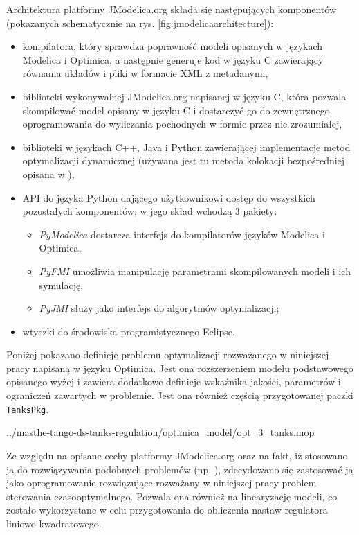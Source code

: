 Architektura platformy JModelica.org składa się następujących komponentów (pokazanych schematycznie na rys. \ref{fig:jmodelicaarchitecture}):
\begin{itemize}
    \item kompilatora, który sprawdza poprawność modeli opisanych w językach Modelica i Optimica, a następnie generuje kod w języku C zawierający równania układów i pliki w formacie XML z metadanymi,
    \item biblioteki wykonywalnej JModelica.org napisanej w języku C, która pozwala skompilować model opisany w języku C i dostarczyć go do zewnętrznego oprogramowania do wyliczania pochodnych w formie przez nie zrozumiałej,
    \item biblioteki w językach C++, Java i Python zawierającej implementacje metod optymalizacji dynamicznej (używana jest tu metoda kolokacji bezpośredniej opisana w \cite{ake+10cace}),
    \item API do języka Python dającego użytkownikowi dostęp do wszystkich pozostałych komponentów; w jego skład wchodzą 3 pakiety:
    \begin{itemize}
        \item \emph{PyModelica} dostarcza interfejs do kompilatorów języków Modelica i Optimica,
        \item \emph{PyFMI} umożliwia manipulację parametrami skompilowanych modeli i ich symulację,
        \item \emph{PyJMI} służy jako interfejs do algorytmów optymalizacji;
    \end{itemize}
    \item wtyczki do środowiska programistycznego Eclipse.
\end{itemize}

Poniżej pokazano definicję problemu optymalizacji rozważanego w niniejszej pracy napisaną w języku Optimica.
Jest ona rozszerzeniem modelu podstawowego opisanego wyżej i zawiera dodatkowe definicje wskaźnika jakości, parametrów i ograniczeń zawartych w problemie. Jest ona również częścią przygotowanej paczki \texttt{TanksPkg}.


{../masthe-tango-ds-tanks-regulation/optimica_model/opt_3_tanks.mop}

Ze względu na opisane cechy platformy JModelica.org oraz na fakt, iż stosowano ją do rozwiązywania podobnych problemów (np. \cite{Hast09}), zdecydowano się zastosować ją jako oprogramowanie rozwiązujące rozważany w niniejszej pracy problem sterowania czasooptymalnego. Pozwala ona również na linearyzację modeli, co zostało wykorzystane w celu przygotowania do obliczenia nastaw regulatora liniowo-kwadratowego.

